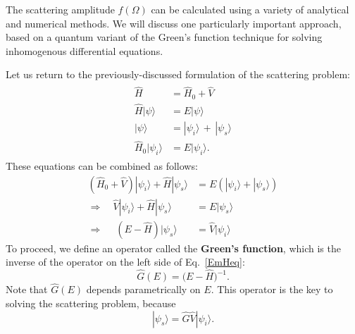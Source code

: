 \documentclass[pra,12pt]{revtex4-2}
\begin{document}
The scattering amplitude $f(\Omega)$ can be calculated using a variety
of analytical and numerical methods.  We will discuss one particularly
important approach, based on a quantum variant of the Green's function
technique for solving inhomogenous differential equations.

Let us return to the previously-discussed formulation of the
scattering problem:
\begin{align}
  \begin{aligned} \hat{H} &= \hat{H}_0+\hat{V} \\ \hat{H} |\psi\rangle &= E |\psi\rangle \\ |\psi\rangle &= |\psi_i\rangle \,+\, |\psi_s\rangle \\ \hat{H}_0 |\psi_i\rangle &= E |\psi_i\rangle.\end{aligned}
\end{align}
These equations can be combined as follows:
\begin{align}
  \left(\hat{H}_0 + \hat{V}\right) |\psi_i\rangle + \hat{H} |\psi_s\rangle &= E \left( |\psi_i\rangle + |\psi_s\rangle \right) \\
  \Rightarrow \quad \hat{V} |\psi_i\rangle + \hat{H} |\psi_s\rangle &= E |\psi_s\rangle  \\
  \Rightarrow \quad\; \left(E - \hat{H}\right) |\psi_s\rangle & = \hat{V} |\psi_i\rangle \label{EmHeq}
\end{align}
To proceed, we define an operator called the \textbf{Green's
  function}, which is the inverse of the operator on the left side of
Eq.~\eqref{EmHeq}:
\begin{equation}
  \hat{G}(E) = \big(E-\hat{H}\big)^{-1}.
  \label{Gdef}
\end{equation}
Note that $\hat{G}(E)$ depends parametrically on $E$.  This operator
is the key to solving the scattering problem, because
\begin{equation}
  |\psi_s\rangle = \hat{G} \hat{V} |\psi_i\rangle.
  \label{scatterform}
\end{equation}
\end{document}
